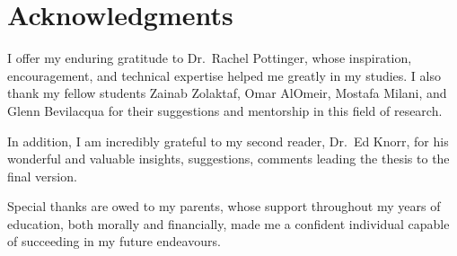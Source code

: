 
\chapter{Acknowledgments}

I offer my enduring gratitude to Dr.\ Rachel Pottinger, whose inspiration, encouragement, and technical expertise helped me greatly in my studies. I also thank my fellow students Zainab Zolaktaf, Omar AlOmeir, Mostafa Milani, and Glenn Bevilacqua for their suggestions and mentorship in this field of research.

In addition, I am incredibly grateful to my second reader, Dr.\ Ed Knorr, for his wonderful and valuable insights, suggestions, comments leading the thesis to the final version.

Special thanks are owed to my parents, whose support throughout my years of education, both morally and financially, made me a confident individual capable of succeeding in my future endeavours.
\endinput
